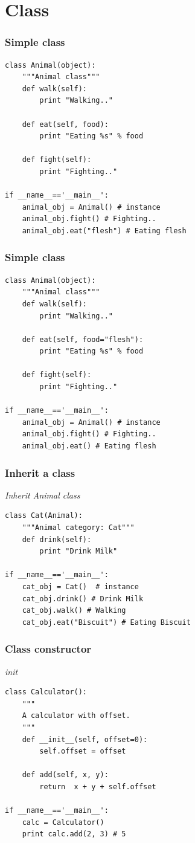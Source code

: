 \documentclass[bigger, presentation]{beamer}
\begin{document}
\section{Class}
\label{sec-3}
\begin{frame}[fragile]
\frametitle{Simple class}
\label{sec-3-1}



\begin{verbatim}
class Animal(object):
    """Animal class"""
    def walk(self):
        print "Walking.."

    def eat(self, food):
        print "Eating %s" % food

    def fight(self):
        print "Fighting.."

if __name__=='__main__':
    animal_obj = Animal() # instance
    animal_obj.fight() # Fighting..
    animal_obj.eat("flesh") # Eating flesh
\end{verbatim}
\end{frame}
\begin{frame}[fragile]
\frametitle{Simple class}
\label{sec-3-2}



\begin{verbatim}
class Animal(object):
    """Animal class"""
    def walk(self):
        print "Walking.."

    def eat(self, food="flesh"):
        print "Eating %s" % food

    def fight(self):
        print "Fighting.."

if __name__=='__main__':
    animal_obj = Animal() # instance
    animal_obj.fight() # Fighting..
    animal_obj.eat() # Eating flesh
\end{verbatim}
\end{frame}
\begin{frame}[fragile]
\frametitle{Inherit a class}
\label{sec-3-3}

   \emph{Inherit Animal class}


\begin{verbatim}
class Cat(Animal):
    """Animal category: Cat"""
    def drink(self):
        print "Drink Milk"

if __name__=='__main__':
    cat_obj = Cat()  # instance
    cat_obj.drink() # Drink Milk
    cat_obj.walk() # Walking
    cat_obj.eat("Biscuit") # Eating Biscuit
\end{verbatim}
\end{frame}
\begin{frame}[fragile]
\frametitle{Class constructor}
\label{sec-3-4}

   \emph{init}


\begin{verbatim}
class Calculator():
    """
    A calculator with offset.
    """
    def __init__(self, offset=0):
        self.offset = offset

    def add(self, x, y):
        return  x + y + self.offset

if __name__=='__main__':
    calc = Calculator()
    print calc.add(2, 3) # 5
\end{verbatim}
\end{frame}
\end{document}
